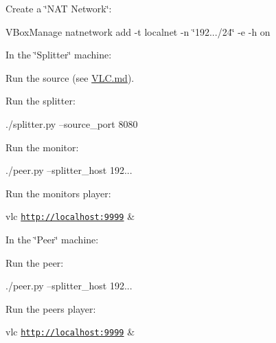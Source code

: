 
\begin{DoxyEnumerate}
\item Create a \char`\"{}\+N\+A\+T Network\char`\"{}\+:
\end{DoxyEnumerate}

V\+Box\+Manage natnetwork add -\/t localnet -\/n \char`\"{}192.../24\char`\"{} -\/e -\/h on


\begin{DoxyEnumerate}
\item In the \char`\"{}\+Splitter\char`\"{} machine\+:
\begin{DoxyEnumerate}
\item Run the source (see \hyperlink{VLC_8md}{V\+L\+C.\+md}).
\item Run the splitter\+:

./splitter.py --source\+\_\+port 8080
\item Run the monitor\+:

./peer.py --splitter\+\_\+host 192...
\item Run the monitor\textquotesingle{}s player\+:

vlc \href{http://localhost:9999}{\tt http\+://localhost\+:9999} \&
\end{DoxyEnumerate}
\end{DoxyEnumerate}
\begin{DoxyEnumerate}
\item In the \char`\"{}\+Peer\char`\"{} machine\+:
\begin{DoxyEnumerate}
\item Run the peer\+:

./peer.py --splitter\+\_\+host 192...
\item Run the peer\textquotesingle{}s player\+:

vlc \href{http://localhost:9999}{\tt http\+://localhost\+:9999} \& 
\end{DoxyEnumerate}
\end{DoxyEnumerate}
